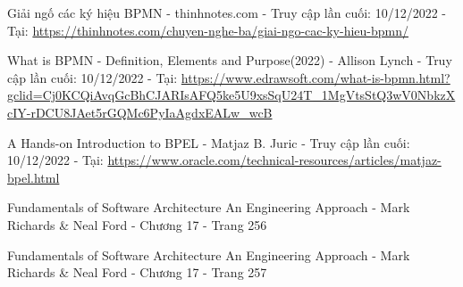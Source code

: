 
\begin{thebibliography}{9}
    Giải ngố các ký hiệu BPMN - thinhnotes.com - Truy cập lần cuối: 10/12/2022 - Tại: \url{https://thinhnotes.com/chuyen-nghe-ba/giai-ngo-cac-ky-hieu-bpmn/}

    What is BPMN - Definition, Elements and Purpose(2022) - Allison Lynch - Truy cập lần cuối: 10/12/2022 - Tại: \url{https://www.edrawsoft.com/what-is-bpmn.html?gclid=Cj0KCQiAvqGcBhCJARIsAFQ5ke5U9xsSqU24T_1MgVtsStQ3wV0NbkzXcIY-rDCU8JAet5rGQMc6PyIaAgdxEALw_wcB}

    A Hands-on Introduction to BPEL - Matjaz B. Juric - Truy cập lần cuối: 10/12/2022 - Tại: \url{https://www.oracle.com/technical-resources/articles/matjaz-bpel.html}

    Fundamentals of Software Architecture An Engineering Approach - Mark Richards \& Neal Ford - Chương 17 - Trang 256
    
    Fundamentals of Software Architecture An Engineering Approach - Mark Richards \& Neal Ford - Chương 17 - Trang 257

\end{thebibliography}